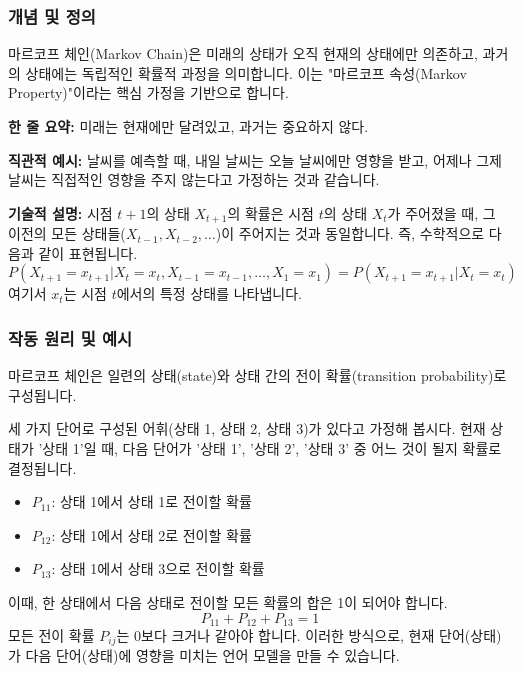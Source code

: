\documentclass[11pt,a4paper]{article}
\theoremstyle{definition}
\begin{document}
\subsubsection{개념 및 정의}
마르코프 체인(Markov Chain)은 미래의 상태가 오직 현재의 상태에만 의존하고, 과거의 상태에는 독립적인 확률적 과정을 의미합니다. 이는 "마르코프 속성(Markov Property)"이라는 핵심 가정을 기반으로 합니다.

\begin{tcolorbox}[conceptbox, title=마르코프 속성 (Markov Property)]
\textbf{한 줄 요약:} 미래는 현재에만 달려있고, 과거는 중요하지 않다.

\textbf{직관적 예시:} 날씨를 예측할 때, 내일 날씨는 오늘 날씨에만 영향을 받고, 어제나 그제 날씨는 직접적인 영향을 주지 않는다고 가정하는 것과 같습니다.

\textbf{기술적 설명:} 시점 $t+1$의 상태 $X_{t+1}$의 확률은 시점 $t$의 상태 $X_t$가 주어졌을 때, 그 이전의 모든 상태들($X_{t-1}, X_{t-2}, \dots$)이 주어지는 것과 동일합니다. 즉, 수학적으로 다음과 같이 표현됩니다.
\[ P(X_{t+1} = x_{t+1} | X_t = x_t, X_{t-1} = x_{t-1}, \dots, X_1 = x_1) = P(X_{t+1} = x_{t+1} | X_t = x_t) \]
여기서 $x_t$는 시점 $t$에서의 특정 상태를 나타냅니다.
\end{tcolorbox}

\subsubsection{작동 원리 및 예시}
마르코프 체인은 일련의 상태(state)와 상태 간의 전이 확률(transition probability)로 구성됩니다.

\begin{examplebox}[title=마르코프 체인 예시: 간단한 어휘 모델]
세 가지 단어로 구성된 어휘(상태 1, 상태 2, 상태 3)가 있다고 가정해 봅시다.
현재 상태가 '상태 1'일 때, 다음 단어가 '상태 1', '상태 2', '상태 3' 중 어느 것이 될지 확률로 결정됩니다.

\begin{itemize}
    \item $P_{11}$: 상태 1에서 상태 1로 전이할 확률
    \item $P_{12}$: 상태 1에서 상태 2로 전이할 확률
    \item $P_{13}$: 상태 1에서 상태 3으로 전이할 확률
\end{itemize}
이때, 한 상태에서 다음 상태로 전이할 모든 확률의 합은 1이 되어야 합니다.
\[ P_{11} + P_{12} + P_{13} = 1 \]
모든 전이 확률 $P_{ij}$는 0보다 크거나 같아야 합니다.
이러한 방식으로, 현재 단어(상태)가 다음 단어(상태)에 영향을 미치는 언어 모델을 만들 수 있습니다.
\end{examplebox}
\end{document}
